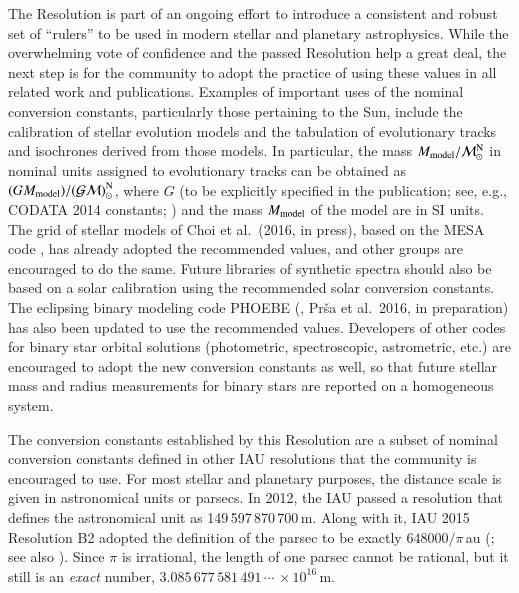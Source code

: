 \documentclass[preprint]{aastex}
\newcommand{\Mnom}{\hbox{$\mathcal{M}^{\mathrm N}_\odot$}}
\newcommand{\GMnom}{\hbox{$\mathcal{(GM)}^{\mathrm N}_\odot$}}
\begin{document}
The Resolution is part of an ongoing effort to introduce a consistent and robust set of ``rulers'' to be used in modern stellar and planetary astrophysics. While the overwhelming vote of confidence and the passed Resolution help a great deal, the next step is for the community to adopt the practice of using these values in all related work and publications. Examples of important uses of the nominal conversion constants, particularly those pertaining to the Sun, include the calibration of stellar evolution models and the tabulation of evolutionary tracks and isochrones derived from those models. In particular, the mass $M_\mathrm{model}/\Mnom$ in nominal units assigned to evolutionary tracks can be obtained as $(G M_{\rm model})/\GMnom$, where $G$ (to be explicitly specified in the publication; see, e.g., CODATA 2014 constants; \citealt{mohr2015}) and the mass $M_{\rm model}$ of the model are in SI units. The grid of stellar models of Choi et al.\ (2016, in press), based on the MESA code \citep{paxton2011, paxton2013, paxton2015}, has already adopted the recommended values, and other groups are encouraged to do the same. Future libraries of synthetic spectra should also be based on a solar calibration using the recommended solar conversion constants. The eclipsing binary modeling code PHOEBE (\citealt{prsa2005}, Pr\v sa et al.~2016, in preparation) has also been updated to use the recommended values. Developers of other codes for binary star orbital solutions (photometric, spectroscopic, astrometric, etc.) are encouraged to adopt the new conversion constants as well, so that future stellar mass and radius measurements for binary stars are reported on a homogeneous system.

The conversion constants established by this Resolution are a subset of nominal conversion constants defined in other IAU resolutions that the community is encouraged to use. For most stellar and planetary purposes, the distance scale is given in astronomical units or parsecs. In 2012, the IAU passed a resolution that defines the astronomical unit as 149\,597\,870\,700\,m. Along with it, IAU 2015 Resolution B2 adopted the definition of the parsec to be exactly $648000/\pi$\,au (\citealt{binney2008}; see also \citealt{cox2000}). Since $\pi$ is irrational, the length of one parsec cannot be rational, but it still is an \emph{exact} number, $3.085\,677\,581\,491\,\cdots\, \times 10^{16}$\,m.
\end{document}

